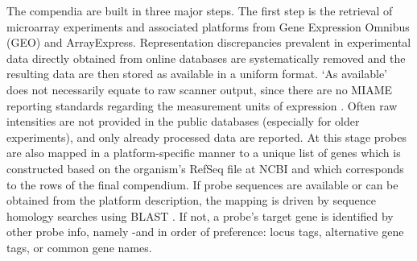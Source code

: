 The compendia are built in three major steps. The first step is the retrieval 
of microarray experiments and associated platforms from Gene Expression Omnibus 
(GEO) and ArrayExpress. Representation discrepancies prevalent in experimental 
data directly obtained from online databases are systematically removed and the 
resulting data are then stored as available in a uniform format. `As available' 
does not necessarily equate to raw scanner output, since there are no MIAME 
reporting standards regarding the measurement units of expression 
\cite{Brazma2001, Brazma2009}. Often raw intensities are not provided in the 
public databases (especially for older experiments), and only already processed 
data are reported. At this stage probes are also mapped in a platform-specific 
manner to a unique list of genes which is constructed based on the organism's 
RefSeq file at NCBI \cite{Pruitt2007} and which corresponds to the rows of the 
final compendium. If probe sequences are available or can be obtained from the 
platform description, the mapping is driven by sequence homology searches using 
BLAST \cite{Altschul1997}. If not, a probe's target gene is identified by other 
probe info, namely -and in order of preference: locus tags, alternative gene 
tags, or common gene names.

